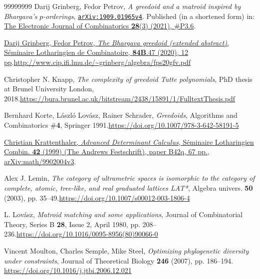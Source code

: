 \documentclass[numbers=enddot,12pt,final,onecolumn,notitlepage]{scrartcl}%
\theoremstyle{definition}
\theoremstyle{plainsl}
\begin{document}
\begin{thebibliography}{99999999}
Darij Grinberg, Fedor Petrov, \textit{A greedoid
and a matroid inspired by Bhargava's }$p$\textit{-orderings},
\texttt{\href{https://arxiv.org/abs/1909.01965v4}{arXiv:1909.01965v4}}.
Published (in a shortened form) in: \href{https://doi.org/10.37236/90460}{The
Electronic Journal of Combinatorics \textbf{28}(3) (2021), \#P3.6}.

%
\href{https://www.mat.univie.ac.at/~slc/wpapers/FPSAC2020/47.html}{Darij
Grinberg, Fedor Petrov, \textit{The Bhargava greedoid (extended abstract)},
S\'{e}minaire Lotharingien de Combinatoire, \textbf{84B}.47 (2020), 12
pp}.\newline\url{http://www.cip.ifi.lmu.de/~grinberg/algebra/fps20gfv.pdf}

Christopher N. Knapp, \textit{The complexity of
greedoid Tutte polynomials}, PhD thesis at Brunel University London,
2018.\newline\url{https://bura.brunel.ac.uk/bitstream/2438/15891/1/FulltextThesis.pdf}

Bernhard Korte, L\'{a}szl\'{o} Lov\'{a}sz, Rainer
Schrader, \textit{Greedoids}, Algorithms and Combinatorics \#\textbf{4},
Springer 1991.\newline\url{https://doi.org/10.1007/978-3-642-58191-5}

%
\href{https://www.mat.univie.ac.at/~kratt/artikel/detsurv.html}{Christian
Krattenthaler, \textit{Advanced Determinant Calculus}, S\'{e}minaire
Lotharingien Combin. \textbf{42} (1999) (The Andrews Festschrift), paper B42q,
67 pp.}, \href{http://arxiv.org/abs/math/9902004v3}{arXiv:math/9902004v3}.

Alex J. Lemin, \textit{The category of ultrametric
spaces is isomorphic to the category of complete, atomic, tree-like, and real
graduated lattices LAT*}, Algebra univers. \textbf{50} (2003), pp.
35--49.\newline\url{https://doi.org/10.1007/s00012-003-1806-4}

L. Lov\'{a}sz, \textit{Matroid matching and some
applications}, Journal of Combinatorial Theory, Series B \textbf{28}, Issue 2,
April 1980, pp. 208--236.\newline\url{https://doi.org/10.1016/0095-8956(80)90066-0}

Vincent Moulton, Charles Semple, Mike Steel,
\textit{Optimizing phylogenetic diversity under constraints}, Journal of
Theoretical Biology \textbf{246} (2007), pp. 186--194. \url{https://doi.org/10.1016/j.jtbi.2006.12.021}


\end{thebibliography}
\end{document}
